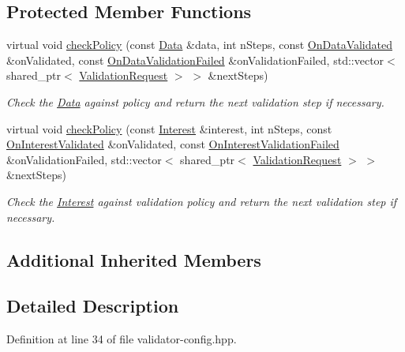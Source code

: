 \subsection*{Protected Member Functions}
\begin{DoxyCompactItemize}
\item 
virtual void \hyperlink{classndn_1_1ValidatorConfig_affe77aeb11b327410559c550f4d5f7d5}{check\+Policy} (const \hyperlink{classndn_1_1Data}{Data} \&data, int n\+Steps, const \hyperlink{namespacendn_aeaa15e849fd25636f59ca61acb64e532}{On\+Data\+Validated} \&on\+Validated, const \hyperlink{namespacendn_ae3c60219d74ba747e368708d93782760}{On\+Data\+Validation\+Failed} \&on\+Validation\+Failed, std\+::vector$<$ shared\+\_\+ptr$<$ \hyperlink{classndn_1_1ValidationRequest}{Validation\+Request} $>$ $>$ \&next\+Steps)
\begin{DoxyCompactList}\small\item\em Check the \hyperlink{classndn_1_1Data}{Data} against policy and return the next validation step if necessary. \end{DoxyCompactList}\item 
virtual void \hyperlink{classndn_1_1ValidatorConfig_a8278481be23217bf06ff436c1e3f8e63}{check\+Policy} (const \hyperlink{classndn_1_1Interest}{Interest} \&interest, int n\+Steps, const \hyperlink{namespacendn_a90fe4b4d97a7870d87f2fce8fdc88f95}{On\+Interest\+Validated} \&on\+Validated, const \hyperlink{namespacendn_a6cb4f04de7c1e8da06d8f5865b3d2877}{On\+Interest\+Validation\+Failed} \&on\+Validation\+Failed, std\+::vector$<$ shared\+\_\+ptr$<$ \hyperlink{classndn_1_1ValidationRequest}{Validation\+Request} $>$ $>$ \&next\+Steps)
\begin{DoxyCompactList}\small\item\em Check the \hyperlink{classndn_1_1Interest}{Interest} against validation policy and return the next validation step if necessary. \end{DoxyCompactList}\end{DoxyCompactItemize}
\subsection*{Additional Inherited Members}


\subsection{Detailed Description}


Definition at line 34 of file validator-\/config.\+hpp.



